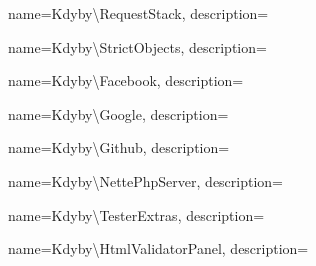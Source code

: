  {
  name={Kdy\-by\textbackslash{}Re\-que\-st\-Sta\-ck},
  description={} }

 {
  name={Kdy\-by\textbackslash{}Stri\-ct\-Ob\-je\-ct\-s},
  description={} }

 {
  name={Kdy\-by\textbackslash{}Fa\-ce\-book},
  description={} }

 {
  name={Kdy\-by\textbackslash{}Google},
  description={} }

 {
  name={Kdy\-by\textbackslash{}Git\-hub},
  description={} }

 {
  name={Kdy\-by\textbackslash{}Nette\-Php\-Ser\-ver},
  description={} }

 {
  name={Kdy\-by\textbackslash{}Tes\-ter\-Ex\-tras},
  description={} }

 {
  name={Kdy\-by\textbackslash{}Html\-Va\-li\-da\-tor\-Pa\-nel},
  description={} }
